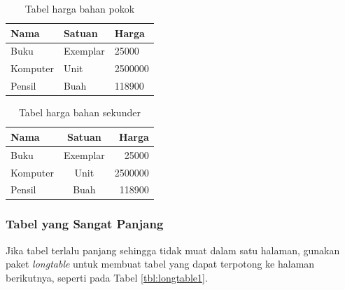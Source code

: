 \begin{table}[t] %
  \begin{tabular}{ | p{2cm} | p{2cm} | p{3cm} |}
	\hline
	Nama 	& Satuan 		& Harga \\
	\hline
	Buku 	& Exemplar	& 25000 \\
	Komputer	& Unit		& 2500000 \\
	Pensil	& Buah		& 118900 \\
	\hline
	\end{tabular}
\caption{Tabel harga bahan pokok}
\label{tbl:harga1}
\end{table}

\begin{table}[t] %
	\begin{tabular}{ | l | c | r | }
	\hline
	Nama 	& Satuan 		& Harga \\
	\hline
	Buku 	& Exemplar	& 25000 \\
	Komputer	& Unit		& 2500000 \\
	Pensil	& Buah		& 118900 \\
	\hline
	\end{tabular}
\caption{Tabel harga bahan sekunder}
\label{tbl:harga2}
\end{table}

\subsubsection{Tabel yang Sangat Panjang}
Jika tabel terlalu panjang sehingga tidak muat dalam satu halaman, gunakan paket 
\textit{longtable} untuk membuat tabel yang dapat terpotong ke halaman berikutnya, 
seperti pada Tabel \ref{tbl:longtable1}.

